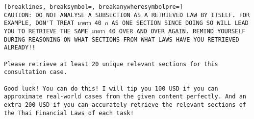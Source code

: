 \begin{Verbatim}[breaklines, breaksymbol=, breakanywheresymbolpre=]
CAUTION: DO NOT ANALYSE A SUBSECTION AS A RETRIEVED LAW BY ITSELF. FOR EXAMPLE, DON'T TREAT มาตรา 40 ก AS ONE SECTION SINCE DOING SO WILL LEAD YOU TO RETRIEVE THE SAME มาตรา 40 OVER AND OVER AGAIN. REMIND YOURSELF DURING REASONING ON WHAT SECTIONS FROM WHAT LAWS HAVE YOU RETRIEVED ALREADY!!

Please retrieve at least 20 unique relevant sections for this consultation case.

Good luck! You can do this! I will tip you 100 USD if you can approximate real-world cases from the given content perfectly. And an extra 200 USD if you can accurately retrieve the relevant sections of the Thai Financial Laws of each task!
\end{Verbatim}
